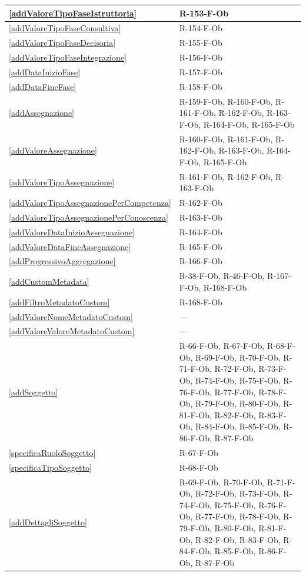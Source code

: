 \begin{longtable}{|p{4cm}|p{10cm}|}
\hline
\ref{addValoreTipoFaseIstruttoria} & R-153-F-Ob \\
\hline
\ref{addValoreTipoFaseConsultiva} & R-154-F-Ob \\
\hline
\ref{addValoreTipoFaseDecisoria} & R-155-F-Ob \\
\hline
\ref{addValoreTipoFaseIntegrazione} & R-156-F-Ob \\
\hline
\ref{addDataInizioFase} & R-157-F-Ob \\
\hline
\ref{addDataFineFase} & R-158-F-Ob \\
\hline
\ref{addAssegnazione} & R-159-F-Ob, R-160-F-Ob, R-161-F-Ob, R-162-F-Ob, R-163-F-Ob, R-164-F-Ob, R-165-F-Ob \\
\hline
\ref{addValoreAssegnazione} & R-160-F-Ob, R-161-F-Ob, R-162-F-Ob, R-163-F-Ob, R-164-F-Ob, R-165-F-Ob \\
\hline
\ref{addValoreTipoAssegnazione} & R-161-F-Ob, R-162-F-Ob, R-163-F-Ob \\
\hline
\ref{addValoreTipoAssegnazionePerCompetenza} & R-162-F-Ob \\
\hline
\ref{addValoreTipoAssegnazionePerConoscenza} & R-163-F-Ob \\
\hline
\ref{addValoreDataInizioAssegnazione} & R-164-F-Ob \\
\hline
\ref{addValoreDataFineAssegnazione} & R-165-F-Ob \\
\hline
\ref{addProgressivoAggregazione} & R-166-F-Ob \\
\hline
\ref{addCustomMetadata} & R-38-F-Ob, R-46-F-Ob, R-167-F-Ob, R-168-F-Ob \\
\hline
\ref{addFiltroMetadatoCustom} & R-168-F-Ob \\
\hline
\ref{addValoreNomeMetadatoCustom} & --- \\
\hline
\ref{addValoreValoreMetadatoCustom} & --- \\
\hline
\ref{addSoggetto} & R-66-F-Ob, R-67-F-Ob, R-68-F-Ob, R-69-F-Ob, R-70-F-Ob, R-71-F-Ob, R-72-F-Ob, R-73-F-Ob, R-74-F-Ob, R-75-F-Ob, R-76-F-Ob, R-77-F-Ob, R-78-F-Ob, R-79-F-Ob, R-80-F-Ob, R-81-F-Ob, R-82-F-Ob, R-83-F-Ob, R-84-F-Ob, R-85-F-Ob, R-86-F-Ob, R-87-F-Ob \\
\hline
\ref{specificaRuoloSoggetto} & R-67-F-Ob \\
\hline
\ref{specificaTipoSoggetto} & R-68-F-Ob \\
\hline
\ref{addDettagliSoggetto} & R-69-F-Ob, R-70-F-Ob, R-71-F-Ob, R-72-F-Ob, R-73-F-Ob, R-74-F-Ob, R-75-F-Ob, R-76-F-Ob, R-77-F-Ob, R-78-F-Ob, R-79-F-Ob, R-80-F-Ob, R-81-F-Ob, R-82-F-Ob, R-83-F-Ob, R-84-F-Ob, R-85-F-Ob, R-86-F-Ob, R-87-F-Ob \\

\end{longtable}
